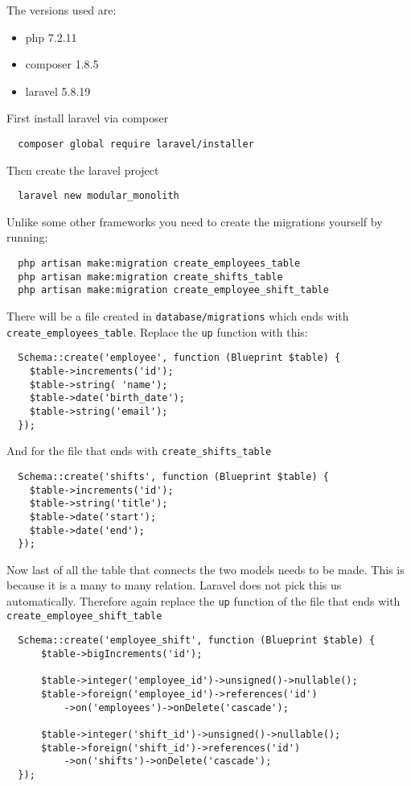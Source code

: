The versions used are:
\begin{itemize}
  \item php 7.2.11
  \item composer 1.8.5
  \item laravel 5.8.19
\end{itemize}

First install laravel via composer
\begin{verbatim}
  composer global require laravel/installer
\end{verbatim}

Then create the laravel project
\begin{verbatim}
  laravel new modular_monolith
\end{verbatim}

Unlike some other frameworks you need to create the migrations yourself by running:
\begin{verbatim}
  php artisan make:migration create_employees_table
  php artisan make:migration create_shifts_table
  php artisan make:migration create_employee_shift_table
\end{verbatim}

There will be a file created in \texttt{database/migrations} which ends with \texttt{create\_employees\_table}. Replace the \texttt{up} function with this:
\begin{verbatim}
  Schema::create('employee', function (Blueprint $table) {
    $table->increments('id');
    $table->string( 'name');
    $table->date('birth_date');
    $table->string('email');
  });
\end{verbatim}

And for the file that ends with \texttt{create\_shifts\_table}
\begin{verbatim}
  Schema::create('shifts', function (Blueprint $table) {
    $table->increments('id');
    $table->string('title');
    $table->date('start');
    $table->date('end');
  });
\end{verbatim}

Now last of all the table that connects the two models needs to be made. This is because it is a many to many relation. Laravel does not pick this us automatically. Therefore again replace the \texttt{up} function of the file that ends with \texttt{create\_employee\_shift\_table}
\begin{verbatim}
  Schema::create('employee_shift', function (Blueprint $table) {
      $table->bigIncrements('id');

      $table->integer('employee_id')->unsigned()->nullable();
      $table->foreign('employee_id')->references('id')
          ->on('employees')->onDelete('cascade');

      $table->integer('shift_id')->unsigned()->nullable();
      $table->foreign('shift_id')->references('id')
          ->on('shifts')->onDelete('cascade');
  });
\end{verbatim}

